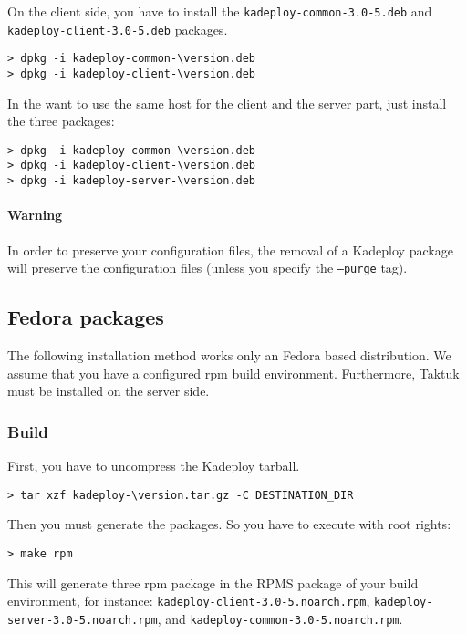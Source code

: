 \documentclass[a4wide,10pt,oneside]{book}
\newcommand{\version}{3.0-5}
\begin{document}
\noindent On the client side, you have to install the \texttt{kadeploy-common-\version.deb} and \texttt{kadeploy-client-\version.deb} packages.
\begin{small}
\begin{Verbatim}[commandchars=\\\{\}]
> dpkg -i kadeploy-common-\version.deb
> dpkg -i kadeploy-client-\version.deb
\end{Verbatim}
\end{small}

\noindent In the want to use the same host for the client and the server part, just install the three packages:
\begin{small}
\begin{Verbatim}[commandchars=\\\{\}]
> dpkg -i kadeploy-common-\version.deb
> dpkg -i kadeploy-client-\version.deb
> dpkg -i kadeploy-server-\version.deb
\end{Verbatim}
\end{small}

\paragraph{Warning}
In order to preserve your configuration files, the removal of a Kadeploy package will preserve the configuration files (unless you specify the \texttt{--purge} tag).

\subsection{Fedora packages}
The following installation method works only an Fedora based distribution. We assume that you have a configured rpm build environment. Furthermore, Taktuk must be installed on the server side.
\subsubsection{Build}
\noindent First, you have to uncompress the Kadeploy tarball. 
\begin{small}
\begin{Verbatim}[commandchars=\\\{\}]
> tar xzf kadeploy-\version.tar.gz -C DESTINATION_DIR
\end{Verbatim}
\end{small}

\noindent Then you must generate the packages. So you have to execute with root rights:
\begin{small}
\begin{verbatim}
> make rpm
\end{verbatim}
\end{small}
This will generate three rpm package in the RPMS package of your build environment, for instance: \texttt{kadeploy-client-\version.noarch.rpm}, \texttt{kadeploy-server-\version.noarch.rpm}, and \texttt{kadeploy-common-\version.noarch.rpm}.
\end{document}
